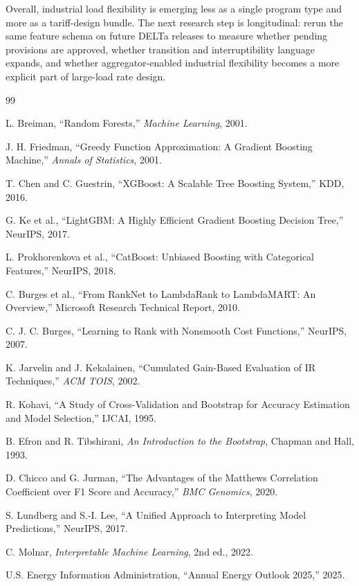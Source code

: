 \documentclass[11pt]{article}
\begin{document}
Overall, industrial load flexibility is emerging less as a single program type and more as a tariff-design bundle. The next research step is longitudinal: rerun the same feature schema on future DELTa releases to measure whether pending provisions are approved, whether transition and interruptibility language expands, and whether aggregator-enabled industrial flexibility becomes a more explicit part of large-load rate design.

\begin{thebibliography}{99}

L. Breiman, ``Random Forests,'' \textit{Machine Learning}, 2001.

J. H. Friedman, ``Greedy Function Approximation: A Gradient Boosting Machine,'' \textit{Annals of Statistics}, 2001.

T. Chen and C. Guestrin, ``XGBoost: A Scalable Tree Boosting System,'' KDD, 2016.

G. Ke et al., ``LightGBM: A Highly Efficient Gradient Boosting Decision Tree,'' NeurIPS, 2017.

L. Prokhorenkova et al., ``CatBoost: Unbiased Boosting with Categorical Features,'' NeurIPS, 2018.

C. Burges et al., ``From RankNet to LambdaRank to LambdaMART: An Overview,'' Microsoft Research Technical Report, 2010.

C. J. C. Burges, ``Learning to Rank with Nonsmooth Cost Functions,'' NeurIPS, 2007.

K. Jarvelin and J. Kekalainen, ``Cumulated Gain-Based Evaluation of IR Techniques,'' \textit{ACM TOIS}, 2002.

R. Kohavi, ``A Study of Cross-Validation and Bootstrap for Accuracy Estimation and Model Selection,'' IJCAI, 1995.

B. Efron and R. Tibshirani, \textit{An Introduction to the Bootstrap}, Chapman and Hall, 1993.

D. Chicco and G. Jurman, ``The Advantages of the Matthews Correlation Coefficient over F1 Score and Accuracy,'' \textit{BMC Genomics}, 2020.

S. Lundberg and S.-I. Lee, ``A Unified Approach to Interpreting Model Predictions,'' NeurIPS, 2017.

C. Molnar, \textit{Interpretable Machine Learning}, 2nd ed., 2022.

U.S. Energy Information Administration, ``Annual Energy Outlook 2025,'' 2025.


\end{thebibliography}
\end{document}

